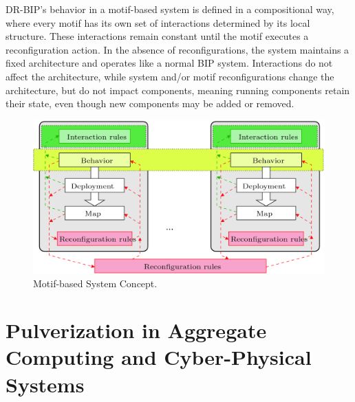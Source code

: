 DR-BIP's behavior in a motif-based system is defined in a compositional way, where every motif has its own set of interactions determined by its
local structure. These interactions remain constant until the motif executes a reconfiguration action. In the absence of reconfigurations, the system
maintains a fixed architecture and operates like a normal BIP system. Interactions do not affect the architecture, while system and/or motif
reconfigurations change the architecture, but do not impact components, meaning running components retain their state, even though new components may
be added or removed.

\begin{figure}
	\centering
	\includegraphics[width=0.8\linewidth]{figures/motif-concept.png}
	\caption{Motif-based System Concept.}
	\label{fig:motif-concept}
\end{figure}


\section{Pulverization in Aggregate Computing and Cyber-Physical Systems}
\label{sec:pulverization-aggregate-computing-cps}

